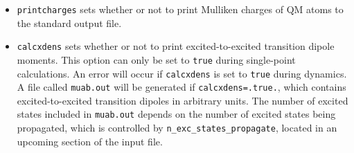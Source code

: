 \documentclass[letterpaper,12pt,titlepage]{article}
\begin{document}
\begin{itemize}
\item \verb+printcharges+ sets whether or not to print Mulliken charges of QM atoms to the standard output file.
\item \verb+calcxdens+ sets whether or not to print excited-to-excited transition dipole moments.  This option can only be set to \verb+true+ during single-point calculations.  An error will occur if \verb+calcxdens+ is set to \verb+true+ during dynamics.  A file called \verb+muab.out+ will be generated if \verb+calcxdens=.true.+, which contains excited-to-excited transition dipoles in arbitrary units.  The number of excited states included in \verb+muab.out+ depends on the number of excited states being propagated, which is controlled by \verb+n_exc_states_propagate+, located in an upcoming section of the input file.
\end{itemize}
\end{document}

